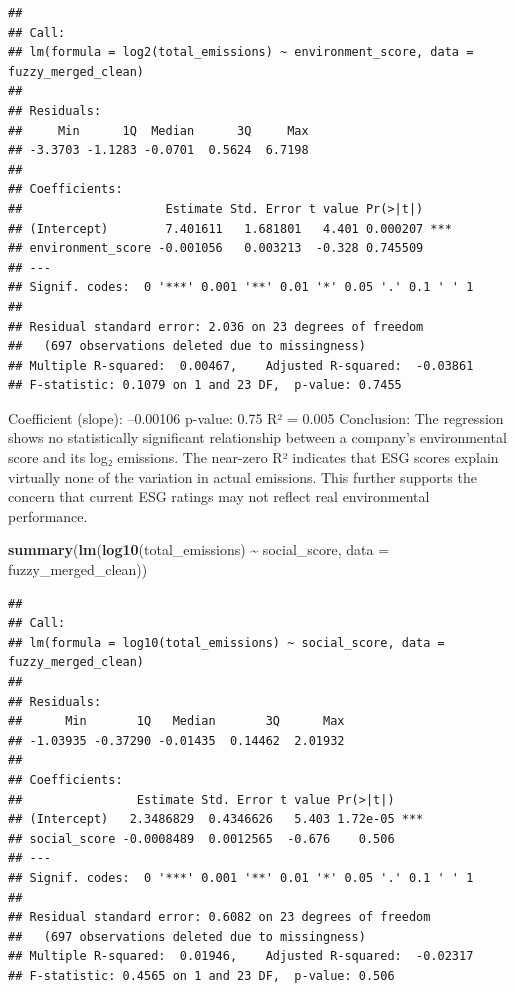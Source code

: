 \documentclass[
]{article}
\newenvironment{Shaded}{\begin{snugshade}}{\end{snugshade}}
\newcommand{\AttributeTok}[1]{\textcolor[rgb]{0.13,0.29,0.53}{#1}}
\newcommand{\FunctionTok}[1]{\textcolor[rgb]{0.13,0.29,0.53}{\textbf{#1}}}
\newcommand{\NormalTok}[1]{#1}
\newcommand{\SpecialCharTok}[1]{\textcolor[rgb]{0.81,0.36,0.00}{\textbf{#1}}}
\begin{document}
\begin{verbatim}
## 
## Call:
## lm(formula = log2(total_emissions) ~ environment_score, data = fuzzy_merged_clean)
## 
## Residuals:
##     Min      1Q  Median      3Q     Max 
## -3.3703 -1.1283 -0.0701  0.5624  6.7198 
## 
## Coefficients:
##                    Estimate Std. Error t value Pr(>|t|)    
## (Intercept)        7.401611   1.681801   4.401 0.000207 ***
## environment_score -0.001056   0.003213  -0.328 0.745509    
## ---
## Signif. codes:  0 '***' 0.001 '**' 0.01 '*' 0.05 '.' 0.1 ' ' 1
## 
## Residual standard error: 2.036 on 23 degrees of freedom
##   (697 observations deleted due to missingness)
## Multiple R-squared:  0.00467,    Adjusted R-squared:  -0.03861 
## F-statistic: 0.1079 on 1 and 23 DF,  p-value: 0.7455
\end{verbatim}

Coefficient (slope): --0.00106 p-value: 0.75 R² = 0.005 Conclusion: The
regression shows no statistically significant relationship between a
company's environmental score and its log₂ emissions. The near-zero R²
indicates that ESG scores explain virtually none of the variation in
actual emissions. This further supports the concern that current ESG
ratings may not reflect real environmental performance.

\begin{Shaded}
\begin{Highlighting}[]
\FunctionTok{summary}\NormalTok{(}\FunctionTok{lm}\NormalTok{(}\FunctionTok{log10}\NormalTok{(total\_emissions) }\SpecialCharTok{\textasciitilde{}}\NormalTok{ social\_score, }\AttributeTok{data =}\NormalTok{ fuzzy\_merged\_clean))}
\end{Highlighting}
\end{Shaded}

\begin{verbatim}
## 
## Call:
## lm(formula = log10(total_emissions) ~ social_score, data = fuzzy_merged_clean)
## 
## Residuals:
##      Min       1Q   Median       3Q      Max 
## -1.03935 -0.37290 -0.01435  0.14462  2.01932 
## 
## Coefficients:
##                Estimate Std. Error t value Pr(>|t|)    
## (Intercept)   2.3486829  0.4346626   5.403 1.72e-05 ***
## social_score -0.0008489  0.0012565  -0.676    0.506    
## ---
## Signif. codes:  0 '***' 0.001 '**' 0.01 '*' 0.05 '.' 0.1 ' ' 1
## 
## Residual standard error: 0.6082 on 23 degrees of freedom
##   (697 observations deleted due to missingness)
## Multiple R-squared:  0.01946,    Adjusted R-squared:  -0.02317 
## F-statistic: 0.4565 on 1 and 23 DF,  p-value: 0.506
\end{verbatim}
\end{document}
